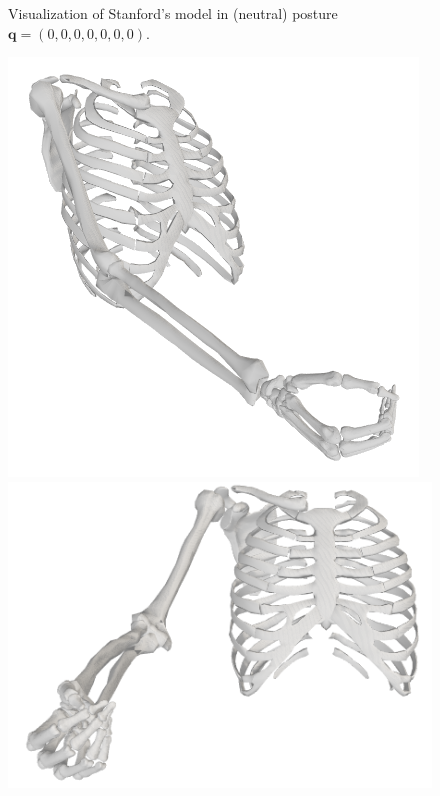 \begin{figure}[!htb]
\begin{minipage}{0.3\linewidth}
    \end{minipage}
    \caption{Visualization of Stanford's model in (neutral) posture $\mathbf{q} = (0, 0,0,0,0,0,0)$.}
    \label{fig:stanford_neutral_pose}
\end{figure}

\begin{figure}[!htb]
    \centering
    \captionsetup{justification=centering}
    \begin{minipage}{0.3\linewidth}
        \centering
        \includegraphics[trim={0 0 0 0}, clip, width=0.6\linewidth]{img/chapter_4/stanford_view_pose1.png}
    \end{minipage}
    \hfill
    \begin{minipage}{0.3\linewidth}
        \captionsetup{justification=centering}
        \centering
        \includegraphics[trim={0 0 0 0}, clip, width=0.8\linewidth]{img/chapter_4/stanford_frontal_pose1.png}
    \end{minipage}
    \hfill
    \begin{minipage}{0.3\linewidth}
        \captionsetup{justification=centering}

\end{minipage}
\end{figure}
